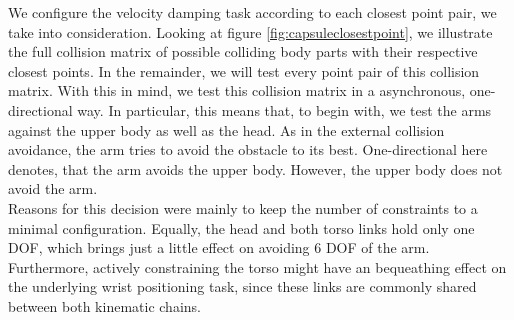 We configure the velocity damping task according to each closest point pair, we take into consideration. Looking at figure \ref{fig:capsuleclosestpoint}, we illustrate the full collision matrix of possible colliding body parts with their respective closest points. In the remainder, we will test every point pair of this collision matrix. With this in mind, we test this collision matrix in a asynchronous, one-directional way. In particular, this means that, to begin with, we test the arms against the upper body as well as the head. As in the external collision avoidance, the arm tries to avoid the obstacle to its best. One-directional here denotes, that the arm avoids the upper body. However, the upper body does not avoid the arm. \\
Reasons for this decision were mainly to keep the number of constraints to a minimal configuration. Equally, the head and both torso links hold only one DOF, which brings just a little effect on avoiding 6 DOF of the arm. Furthermore, actively constraining the torso might have an bequeathing effect on the underlying wrist positioning task, since these links are commonly shared between both kinematic chains.
